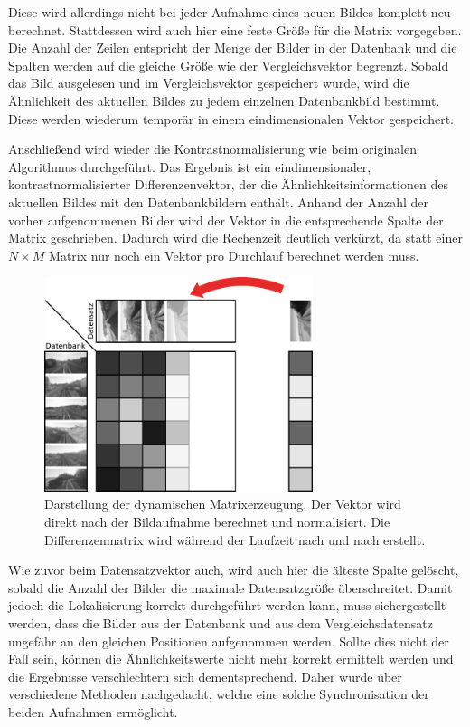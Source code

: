 \documentclass[12pt,a4paper,titlepage]{scrartcl}
\begin{document}
Diese wird allerdings nicht bei jeder Aufnahme eines neuen Bildes komplett neu berechnet. Stattdessen wird auch hier eine feste Größe für die Matrix vorgegeben. Die Anzahl der Zeilen entspricht der Menge der Bilder in der Datenbank und die Spalten werden auf die gleiche Größe wie der Vergleichsvektor begrenzt. Sobald das Bild ausgelesen und im Vergleichsvektor gespeichert wurde, wird die Ähnlichkeit des aktuellen Bildes zu jedem einzelnen Datenbankbild bestimmt. Diese werden wiederum temporär in einem eindimensionalen Vektor gespeichert.

Anschließend wird wieder die Kontrastnormalisierung wie beim originalen Algorithmus durchgeführt. Das Ergebnis ist ein eindimensionaler, kontrastnormalisierter Differenzenvektor, der die Ähnlichkeitsinformationen des aktuellen Bildes mit den Datenbankbildern enthält. Anhand der Anzahl der vorher aufgenommenen Bilder wird der Vektor in die entsprechende Spalte der Matrix geschrieben. Dadurch wird die Rechenzeit deutlich verkürzt, da statt einer $N\times M$ Matrix nur noch ein Vektor pro Durchlauf berechnet werden muss.

\begin{figure}
	\centering
	\includegraphics[width=0.7\textwidth]{../Bilder/Differenzenmatrix_live.pdf}
	\caption[Dynamische Matrixerzeugung]{Darstellung der dynamischen Matrixerzeugung. Der Vektor wird direkt nach der Bildaufnahme berechnet und normalisiert. Die Differenzenmatrix wird während der Laufzeit nach und nach erstellt.}
	\label{img:Diff_Mat_live}
\end{figure}

Wie zuvor beim Datensatzvektor auch, wird auch hier die älteste Spalte gelöscht, sobald die Anzahl der Bilder die maximale Datensatzgröße überschreitet. Damit jedoch die Lokalisierung korrekt durchgeführt werden kann, muss sichergestellt werden, dass die Bilder aus der Datenbank und aus dem Vergleichsdatensatz ungefähr an den gleichen Positionen aufgenommen werden. Sollte dies nicht der Fall sein, können die Ähnlichkeitswerte nicht mehr korrekt ermittelt werden und die Ergebnisse verschlechtern sich dementsprechend. Daher wurde über verschiedene Methoden nachgedacht, welche eine solche Synchronisation der beiden Aufnahmen ermöglicht.
\end{document}
